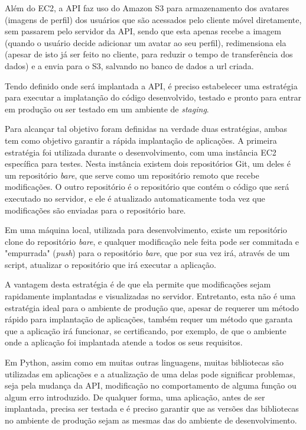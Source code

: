 \documentclass[diss]{template/setrem}
\begin{document}
Além do EC2, a API faz uso do Amazon S3 para armazenamento dos avatares (imagens de perfil) dos usuários que são acessados pelo cliente móvel diretamente, sem passarem pelo servidor da API, sendo que esta apenas recebe a imagem (quando o usuário decide adicionar um avatar ao seu perfil), redimensiona ela (apesar de isto já ser feito no cliente, para reduzir o tempo de transferência dos dados) e a envia para o S3, salvando no banco de dados a url criada.

Tendo definido onde será implantada a API, é preciso estabelecer uma estratégia para executar a implatanção do código desenvolvido, testado e pronto para entrar em produção ou ser testado em um ambiente de \emph{staging}.

Para alcançar tal objetivo foram definidas na verdade duas estratégias, ambas tem como objetivo garantir a rápida implantação de aplicações. A primeira estratégia foi utilizada durante o desenvolvimento, com uma instância EC2 específica para testes. Nesta instância existem dois repositórios Git, um deles é um repositório \emph{bare}, que serve como um repositório remoto que recebe modificações. O outro repositório é o repositório que contém o código que será executado no servidor, e ele é atualizado automaticamente toda vez que modificações são enviadas para o repositório bare.

Em uma máquina local, utilizada para desenvolvimento, existe um repositório clone do repositório \emph{bare}, e qualquer modificação nele feita pode ser commitada e "empurrada" (\emph{push}) para o repositório \emph{bare}, que por sua vez irá, através de um script, atualizar o repositório que irá executar a aplicação.

A vantagem desta estratégia é de que ela permite que modificações sejam rapidamente implantadas e visualizadas no servidor. Entretanto, esta não é uma estratégia ideal para o ambiente de produção que, apesar de requerer um método rápido para implantação de aplicações, também requer um método que garanta que a aplicação irá funcionar, se certificando, por exemplo, de que o ambiente onde a aplicação foi implantada atende a todos os seus requisitos.

Em Python, assim como em muitas outras linguagens, muitas bibliotecas são utilizadas em aplicações e a atualização de uma delas pode significar problemas, seja pela mudança da API, modificação no comportamento de alguma função ou algum erro introduzido. De qualquer forma, uma aplicação, antes de ser implantada, precisa ser testada e é preciso garantir que as versões das bibliotecas no ambiente de produção sejam as mesmas das do ambiente de desenvolvimento.
\end{document}
